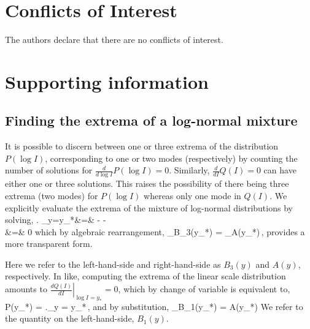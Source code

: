 \documentclass[11pt,a4paper,final]{article}
\begin{document}
\section*{Conflicts of Interest}
The authors declare that there are no conflicts of interest.


%




\newpage
\section*{Supporting information}
%

\subsection*{Finding the extrema of a log-normal mixture}
It is possible to discern between one or three extrema of the distribution $P(\log I)$, corresponding to one or two modes (respectively) by counting the number of solutions for $\frac{d}{d\log I}P(\log I) = 0$. Similarly, $\frac{d}{dI}Q(I)=0$ can have either one or three solutions. This raises the possibility of there being three extrema (two modes) for $P(\log I)$ whereas only one mode in $Q(I)$. We explicitly evaluate the extrema of the mixture of log-normal distributions by solving,
%
\bea \nonumber
  \left. \right\vert_{y=y_*}&=&
  -    -
    \nonumber\\
  &=& 0\nonumber
\eea
%
which by algebraic rearrangement,
%
\be 
  \label{eq:extremaP}
  _{B_3(y_*)} =
    _{A(y_*)}\,,
\ee
%
provides a more transparent form.  

Here we refer to the left-hand-side and right-hand-side as $B_3(y)$ and $A(y)$, respectively. In like, computing the extrema of the linear scale distribution amounts to $\left.\frac{d Q(I)}{dI} \right\vert_{\log I= y_*} = 0$, which by change of variable is equivalent to,
%
\be
\label{eq:QExtremaStrange}
P(y_*) = \left.\right\vert_{y = y_*}\,,
\ee
%
and by substitution,
%
\be
  \label{eq:extremaQ}
  _{B_1(y_*)} = A(y_*) 
\ee
%
We refer to the quantity on the left-hand-side, $B_1(y)$.
\end{document}
